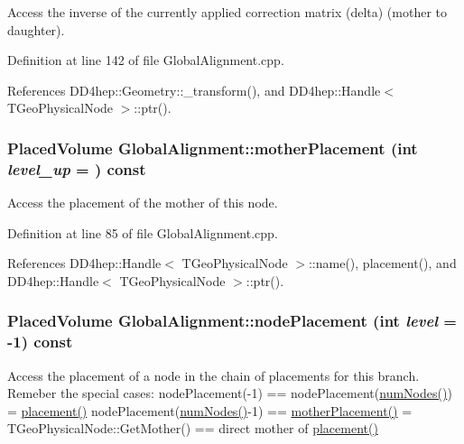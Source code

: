 Access the inverse of the currently applied correction matrix (delta) (mother to daughter). 

Definition at line 142 of file GlobalAlignment.cpp.

References DD4hep::Geometry::\_\-transform(), and DD4hep::Handle$<$ TGeoPhysicalNode $>$::ptr().\hypertarget{class_d_d4hep_1_1_alignments_1_1_global_alignment_a8378dc0dd2250e04561f21a452e0ee5d}{
\subsubsection[{motherPlacement}]{\setlength{\rightskip}{0pt plus 5cm}PlacedVolume GlobalAlignment::motherPlacement (int {\em level\_\-up} = {}) const}}
\label{class_d_d4hep_1_1_alignments_1_1_global_alignment_a8378dc0dd2250e04561f21a452e0ee5d}


Access the placement of the mother of this node. 

Definition at line 85 of file GlobalAlignment.cpp.

References DD4hep::Handle$<$ TGeoPhysicalNode $>$::name(), placement(), and DD4hep::Handle$<$ TGeoPhysicalNode $>$::ptr().\hypertarget{class_d_d4hep_1_1_alignments_1_1_global_alignment_a74a90943af3e537f040e4bd22b738046}{
\subsubsection[{nodePlacement}]{\setlength{\rightskip}{0pt plus 5cm}PlacedVolume GlobalAlignment::nodePlacement (int {\em level} = {\ttfamily -\/1}) const}}
\label{class_d_d4hep_1_1_alignments_1_1_global_alignment_a74a90943af3e537f040e4bd22b738046}


Access the placement of a node in the chain of placements for this branch. Remeber the special cases: nodePlacement(-\/1) == nodePlacement(\hyperlink{class_d_d4hep_1_1_alignments_1_1_global_alignment_a1dba2022e2a869a16901a9606c629d57}{numNodes()}) = \hyperlink{class_d_d4hep_1_1_alignments_1_1_global_alignment_a4445f18516ca144ef79493f15b4042cf}{placement()} nodePlacement(\hyperlink{class_d_d4hep_1_1_alignments_1_1_global_alignment_a1dba2022e2a869a16901a9606c629d57}{numNodes()}-\/1) == \hyperlink{class_d_d4hep_1_1_alignments_1_1_global_alignment_a8378dc0dd2250e04561f21a452e0ee5d}{motherPlacement()} = TGeoPhysicalNode::GetMother() == direct mother of \hyperlink{class_d_d4hep_1_1_alignments_1_1_global_alignment_a4445f18516ca144ef79493f15b4042cf}{placement()} 

